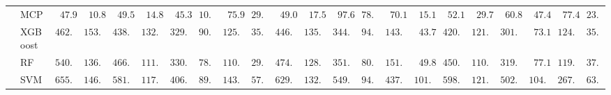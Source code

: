 \begin{tabular}{ll|ll|llllll|llllll|llllll}
	& MCP  & $\phantom{0}47.96$ & $\phantom{0}10.83$ & $\phantom{0}49.51$ & $\phantom{0}14.84$ & $\phantom{0}45.32$ & $10.14$ & $\phantom{0}75.98$ & $29.39$ & $\phantom{0}49.06$ & $\phantom{0}17.54$ & $\phantom{0}97.64$ & $78.45$ & $\phantom{0}70.14$ & $\phantom{0}15.10$ & $\phantom{0}52.12$ & $\phantom{0}29.79$ & $\phantom{0}60.81$ & $\phantom{0}47.45$ & $\phantom{0}77.41$ & $23.86$ \\
	& XGBoost  & $462.42$ & $153.08$ & $438.75$ & $132.30$ & $329.77$ & $90.89$ & $125.16$ & $35.21$ & $446.56$ & $135.46$ & $344.83$ & $94.89$ & $143.48$ & $\phantom{0}43.70$ & $420.52$ & $121.39$ & $301.37$ & $\phantom{0}73.14$ & $124.61$ & $35.86$ \\
	& RF  & $540.97$ & $136.58$ & $466.03$ & $111.18$ & $330.46$ & $78.76$ & $110.13$ & $29.18$ & $474.40$ & $128.25$ & $351.13$ & $80.23$ & $151.07$ & $\phantom{0}49.86$ & $450.25$ & $110.50$ & $319.58$ & $\phantom{0}77.19$ & $119.52$ & $37.83$ \\
	& SVM  & $655.71$ & $146.59$ & $581.13$ & $117.87$ & $406.59$ & $89.66$ & $143.00$ & $57.08$ & $629.70$ & $132.87$ & $549.67$ & $94.82$ & $437.80$ & $101.11$ & $598.30$ & $121.48$ & $502.02$ & $104.82$ & $267.80$ & $63.93$ \\
	\hline 
\end{tabular}